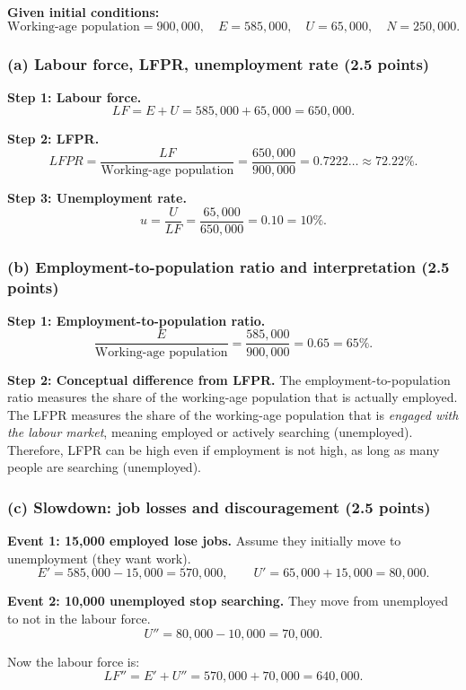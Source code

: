\documentclass[11pt]{article}
\begin{document}
\textbf{Given initial conditions:}
\[
\text{Working-age population} = 900{,}000,\quad
E = 585{,}000,\quad
U = 65{,}000,\quad
N = 250{,}000.
\]

\subsubsection*{(a) Labour force, LFPR, unemployment rate (2.5 points)}

\textbf{Step 1: Labour force.}
\[
LF = E + U = 585{,}000 + 65{,}000 = 650{,}000.
\]

\textbf{Step 2: LFPR.}
\[
LFPR = \frac{LF}{\text{Working-age population}}
= \frac{650{,}000}{900{,}000}
= 0.7222\ldots \approx 72.22\%.
\]

\textbf{Step 3: Unemployment rate.}
\[
u = \frac{U}{LF}
= \frac{65{,}000}{650{,}000}
= 0.10 = 10\%.
\]

\subsubsection*{(b) Employment-to-population ratio and interpretation (2.5 points)}

\textbf{Step 1: Employment-to-population ratio.}
\[
\frac{E}{\text{Working-age population}}
= \frac{585{,}000}{900{,}000}
= 0.65 = 65\%.
\]

\textbf{Step 2: Conceptual difference from LFPR.}
The employment-to-population ratio measures the share of the working-age population that is actually employed.
The LFPR measures the share of the working-age population that is \emph{engaged with the labour market}, meaning employed or actively searching (unemployed).
Therefore, LFPR can be high even if employment is not high, as long as many people are searching (unemployed).

\subsubsection*{(c) Slowdown: job losses and discouragement (2.5 points)}

\textbf{Event 1: 15,000 employed lose jobs.} Assume they initially move to unemployment (they want work).
\[
E' = 585{,}000 - 15{,}000 = 570{,}000,
\qquad
U' = 65{,}000 + 15{,}000 = 80{,}000.
\]

\textbf{Event 2: 10,000 unemployed stop searching.} They move from unemployed to not in the labour force.
\[
U'' = 80{,}000 - 10{,}000 = 70{,}000.
\]

Now the labour force is:
\[
LF'' = E' + U'' = 570{,}000 + 70{,}000 = 640{,}000.
\]
\end{document}
